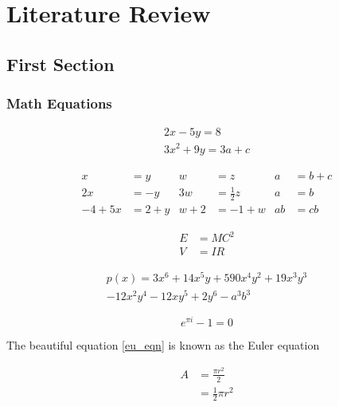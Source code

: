 \chapter{Literature Review}
\lipsum[1-10]
\section{First Section}
\lipsum[1-10]
\subsection{Math Equations}

\begin{gather*} 
2x - 5y =  8 \\ 
3x^2 + 9y =  3a + c
\end{gather*}

\begin{align*}
x&=y           &  w &=z              &  a&=b+c\\
2x&=-y         &  3w&=\frac{1}{2}z   &  a&=b\\
-4 + 5x&=2+y   &  w+2&=-1+w          &  ab&=cb
\end{align*}

\begin{align} 
E &=MC^2 \\
V &=IR
\end{align}%
%
%


\begin{multline*}
p(x) = 3x^6 + 14x^5y + 590x^4y^2 + 19x^3y^3\\ 
- 12x^2y^4 - 12xy^5 + 2y^6 - a^3b^3
\end{multline*}

\begin{equation} \label{eu_eqn}
e^{\pi i} - 1 = 0
\end{equation}
 
The beautiful equation \ref{eu_eqn} is known as the Euler equation

\begin{equation} \label{eq1}
\begin{split}
A & = \frac{\pi r^2}{2} \\
 & = \frac{1}{2} \pi r^2
\end{split}
\end{equation}

